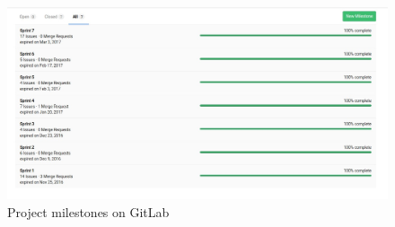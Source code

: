 \begin{figure}[H]
\begin{center}
\includegraphics[width=15cm]{figures/planning_milestones}
\end{center}
\caption{Project milestones on GitLab}
\label{fig:planning_milestones}
\end{figure}
